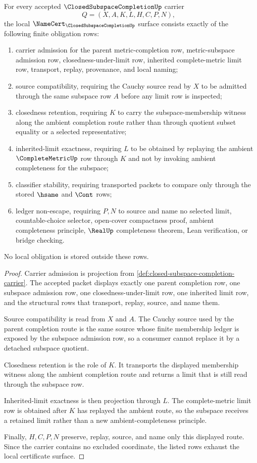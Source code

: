 \begin{theorem}
\label{thm:closed-subspace-completion-namecert-obligations}
For every accepted $\ClosedSubspaceCompletionUp$ carrier
$$
Q=(X,A,K,L,H,C,P,N),
$$
the local $\NameCert_{\ClosedSubspaceCompletionUp}$ surface consists exactly of the following finite obligation rows:
\begin{enumerate}
\item carrier admission for the parent metric-completion row, metric-subspace admission row, closedness-under-limit row, inherited complete-metric limit row, transport, replay, provenance, and local naming;
\item source compatibility, requiring the Cauchy source read by $X$ to be admitted through the same subspace row $A$ before any limit row is inspected;
\item closedness retention, requiring $K$ to carry the subspace-membership witness along the ambient completion route rather than through quotient subset equality or a selected representative;
\item inherited-limit exactness, requiring $L$ to be obtained by replaying the ambient $\CompleteMetricUp$ row through $K$ and not by invoking ambient completeness for the subspace;
\item classifier stability, requiring transported packets to compare only through the stored $\hsame$ and $\Cont$ rows;
\item ledger non-escape, requiring $P,N$ to source and name no selected limit, countable-choice selector, open-cover compactness proof, ambient completeness principle, $\RealUp$ completeness theorem, Lean verification, or bridge checking.
\end{enumerate}
No local obligation is stored outside these rows.
\end{theorem}
\begin{proof}
Carrier admission is projection from \autoref{def:closed-subspace-completion-carrier}. The accepted packet displays exactly one parent completion row, one subspace admission row, one closedness-under-limit row, one inherited limit row, and the structural rows that transport, replay, source, and name them.

Source compatibility is read from $X$ and $A$. The Cauchy source used by the parent completion route is the same source whose finite membership ledger is exposed by the subspace admission row, so a consumer cannot replace it by a detached subspace quotient.

Closedness retention is the role of $K$. It transports the displayed membership witness along the ambient completion route and returns a limit that is still read through the subspace row.

Inherited-limit exactness is then projection through $L$. The complete-metric limit row is obtained after $K$ has replayed the ambient route, so the subspace receives a retained limit rather than a new ambient-completeness principle.

Finally, $H,C,P,N$ preserve, replay, source, and name only this displayed route. Since the carrier contains no excluded coordinate, the listed rows exhaust the local certificate surface.
\end{proof}
